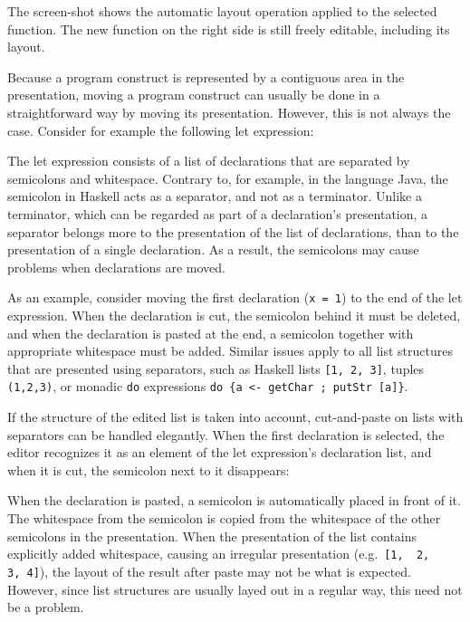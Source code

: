 
The screen-shot shows the automatic layout operation applied to the selected function. The new function on the right side is still freely editable, including its layout.


Because a program construct is represented by a contiguous area in the presentation, moving a program construct can usually be done in a straightforward way by moving its presentation. However, this is not always the case. Consider for example the following let expression:


The let expression consists of a list of declarations that are separated by semicolons and whitespace. Contrary to, for example, in the language Java, the semicolon in Haskell acts as a separator, and not as a terminator. Unlike a terminator, which can be regarded as part of a declaration's presentation, a separator belongs more to the presentation of the list of declarations, than to the presentation of a single declaration. As a result, the semicolons may cause problems when declarations are moved.

As an example, consider moving the first declaration (\verb|x = 1|) to the end of the let expression. When the declaration is cut, the semicolon behind it must be deleted, and when the declaration is pasted at the end, a semicolon together with appropriate whitespace must be added. Similar issues apply to all list structures that are presented using separators, such as Haskell lists \verb|[1, 2, 3]|, tuples \verb|(1,2,3)|, or monadic \verb|do| expressions \verb|do {a <- getChar ; putStr [a]}|.

If the structure of the edited list is taken into account, cut-and-paste on lists with separators can be handled elegantly. When the first declaration is selected, the editor recognizes it as an element of the let expression's declaration list, and when it is cut, the semicolon next to it disappears:


When the declaration is pasted, a semicolon is automatically placed in front of it. The whitespace from the semicolon is copied from the whitespace of the other semicolons in the presentation. When the presentation of the list contains explicitly added whitespace, causing an irregular presentation (e.g.\ \verb|[1,  2,    3, 4]|), the layout of the result after paste may not be what is expected. However, since list structures are usually layed out in a regular way, this need not be a problem. 

